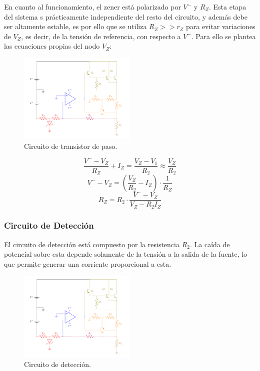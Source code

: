 En cuanto al funcionamiento, el zener está polarizado por $V^{-}$ y $R_Z$. Esta etapa del sistema s prácticamente independiente del resto del circuito, y además debe ser altamente estable, es por ello que se utiliza $R_Z >> r_Z$ para evitar variaciones de $V_Z$, es decir, de la tensión de referencia, con respecto a $V^{-}$. Para ello se plantea las ecuaciones propias del nodo $V_Z$: 
\begin{figure}[H]
\centering
	\includegraphics[width=0.5\textwidth, page=6]{ImagenesEjercicio2/Regulador.pdf}
	\caption{Circuito de transistor de paso.}
	\label{fig:transistorDePaso}
\end{figure}

\begin{equation*}
	\frac{V^{-} - V_Z}{R_Z} + I_Z = \frac{V_Z - V_1}{R_2} \approx \frac{V_Z}{R_2}
\end{equation*}
\begin{equation*}
	V^{-} - V_Z = \left( \frac{V_Z}{R_2} - I_Z \right) \cdot \frac{1}{R_Z}
\end{equation*}
\begin{equation}
	R_Z = R_2 \cdot \frac{V^{-} - V_Z}{V_Z - R_2 I_Z}
	\label{eq:referencia}
\end{equation}

\subsubsection{Circuito de Detección}
\label{sec:circuito-de-deteccion}

El circuito de detección está compuesto por la resistencia $R_2$. La caída de potencial sobre esta depende solamente de la tensión a la salida de la fuente, lo que permite generar una corriente proporcional a esta.

\begin{figure}[H]
\centering
	\includegraphics[width=0.5\textwidth, page=7]{ImagenesEjercicio2/Regulador.pdf}
	\caption{Circuito de detección.}
	\label{fig:circdeteccion}
\end{figure}

